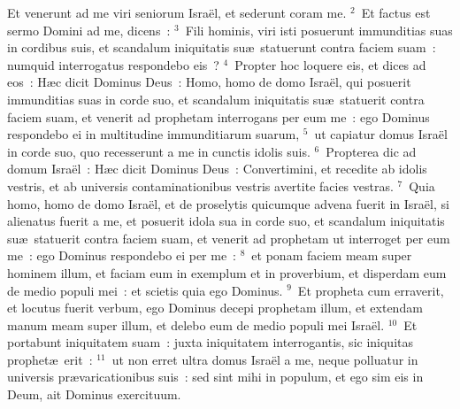 \bchapter
\lettrine[lines=3,image=true,loversize=0.05,lraise=-0.03]{E}{}t venerunt ad me viri seniorum Isra\"el, et sederunt coram me.
${}^{2}$~Et factus est sermo Domini ad me, dicens~:
${}^{3}$~Fili hominis, viri isti posuerunt immunditias suas in cordibus suis, et scandalum iniquitatis su\ae\ statuerunt contra faciem suam~: numquid interrogatus respondebo eis~?
${}^{4}$~Propter hoc loquere eis, et dices ad eos~: H\ae c dicit Dominus Deus~: Homo, homo de domo Isra\"el, qui posuerit immunditias suas in corde suo, et scandalum iniquitatis su\ae\ statuerit contra faciem suam, et venerit ad prophetam interrogans per eum me~: ego Dominus respondebo ei in multitudine immunditiarum suarum,
${}^{5}$~ut capiatur domus Isra\"el in corde suo, quo recesserunt a me in cunctis idolis suis.
${}^{6}$~Propterea dic ad domum Isra\"el~: H\ae c dicit Dominus Deus~: Convertimini, et recedite ab idolis vestris, et ab universis contaminationibus vestris avertite facies vestras.
${}^{7}$~Quia homo, homo de domo Isra\"el, et de proselytis quicumque advena fuerit in Isra\"el, si alienatus fuerit a me, et posuerit idola sua in corde suo, et scandalum iniquitatis su\ae\ statuerit contra faciem suam, et venerit ad prophetam ut interroget per eum me~: ego Dominus respondebo ei per me~:
${}^{8}$~et ponam faciem meam super hominem illum, et faciam eum in exemplum et in proverbium, et disperdam eum de medio populi mei~: et scietis quia ego Dominus.
${}^{9}$~Et propheta cum erraverit, et locutus fuerit verbum, ego Dominus decepi prophetam illum, et extendam manum meam super illum, et delebo eum de medio populi mei Isra\"el.
${}^{10}$~Et portabunt iniquitatem suam~: juxta iniquitatem interrogantis, sic iniquitas prophet\ae\ erit~:
${}^{11}$~ut non erret ultra domus Isra\"el a me, neque polluatur in universis pr\ae varicationibus suis~: sed sint mihi in populum, et ego sim eis in Deum, ait Dominus exercituum.


